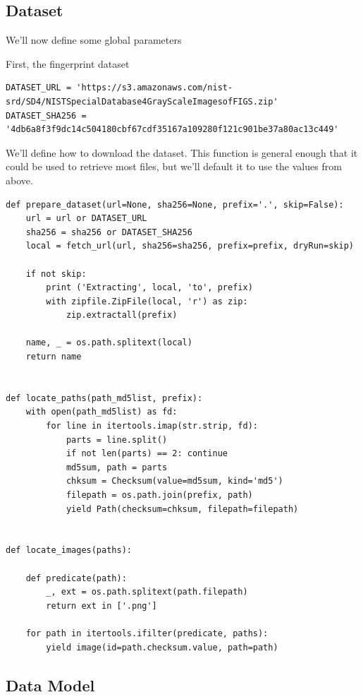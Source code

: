 \subsection{Dataset}\label{dataset}

We'll now define some global parameters

First, the fingerprint dataset

\begin{verbatim}
DATASET_URL = 'https://s3.amazonaws.com/nist-srd/SD4/NISTSpecialDatabase4GrayScaleImagesofFIGS.zip'
DATASET_SHA256 = '4db6a8f3f9dc14c504180cbf67cdf35167a109280f121c901be37a80ac13c449'
\end{verbatim}

We'll define how to download the dataset. This function is general
enough that it could be used to retrieve most files, but we'll default
it to use the values from above.

\begin{verbatim}
def prepare_dataset(url=None, sha256=None, prefix='.', skip=False):
    url = url or DATASET_URL
    sha256 = sha256 or DATASET_SHA256
    local = fetch_url(url, sha256=sha256, prefix=prefix, dryRun=skip)

    if not skip:
        print ('Extracting', local, 'to', prefix)
        with zipfile.ZipFile(local, 'r') as zip:
            zip.extractall(prefix)

    name, _ = os.path.splitext(local)
    return name


def locate_paths(path_md5list, prefix):
    with open(path_md5list) as fd:
        for line in itertools.imap(str.strip, fd):
            parts = line.split()
            if not len(parts) == 2: continue
            md5sum, path = parts
            chksum = Checksum(value=md5sum, kind='md5')
            filepath = os.path.join(prefix, path)
            yield Path(checksum=chksum, filepath=filepath)


def locate_images(paths):

    def predicate(path):
        _, ext = os.path.splitext(path.filepath)
        return ext in ['.png']

    for path in itertools.ifilter(predicate, paths):
        yield image(id=path.checksum.value, path=path)
\end{verbatim}

\subsection{Data Model}\label{data-model}

